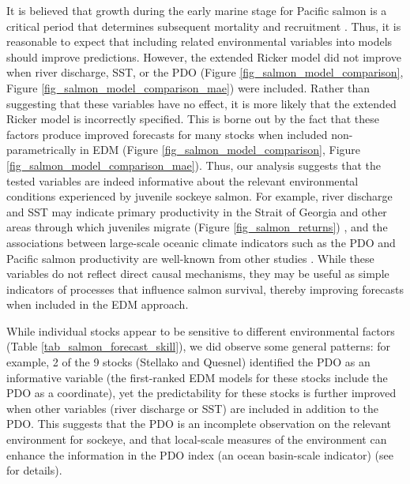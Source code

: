 It is believed that growth during the early marine stage for Pacific salmon is a critical period that determines subsequent mortality and recruitment \cite{Beamish_2001, Beamish_2004a}. Thus, it is reasonable to expect that including related environmental variables into models should improve predictions. However, the extended Ricker model did not improve when river discharge, SST, or the PDO (Figure \ref{fig_salmon_model_comparison}, Figure \ref{fig_salmon_model_comparison_mae}) were included. Rather than suggesting that these variables have no effect, it is more likely that the extended Ricker model is incorrectly specified. This is borne out by the fact that these factors produce improved forecasts for many stocks when included non-parametrically in EDM (Figure \ref{fig_salmon_model_comparison}, Figure \ref{fig_salmon_model_comparison_mae}). Thus, our analysis suggests that the tested variables are indeed informative about the relevant environmental conditions experienced by juvenile sockeye salmon. For example, river discharge and SST may indicate primary productivity in the Strait of Georgia and other areas through which juveniles migrate (Figure \ref{fig_salmon_returns}) \cite{Thomson_2012, Beamish_1994, Preikshot_2012}, and the associations between large-scale oceanic climate indicators such as the PDO and Pacific salmon productivity are well-known from other studies \cite{Mantua_1997, Beamish_1997}. While these variables do not reflect direct causal mechanisms, they may be useful as simple indicators of processes that influence salmon survival, thereby improving forecasts when included in the EDM approach.

While individual stocks appear to be sensitive to different environmental factors (Table \ref{tab_salmon_forecast_skill}), we did observe some general patterns: for example, 2 of the 9 stocks (Stellako and Quesnel) identified the PDO as an informative variable (the first-ranked EDM models for these stocks include the PDO as a coordinate), yet the predictability for these stocks is further improved when other variables (river discharge or SST) are included in addition to the PDO. This suggests that the PDO is an incomplete observation on the relevant environment for sockeye, and that local-scale measures of the environment can enhance the information in the PDO index (an ocean basin-scale indicator) (see  for details).

